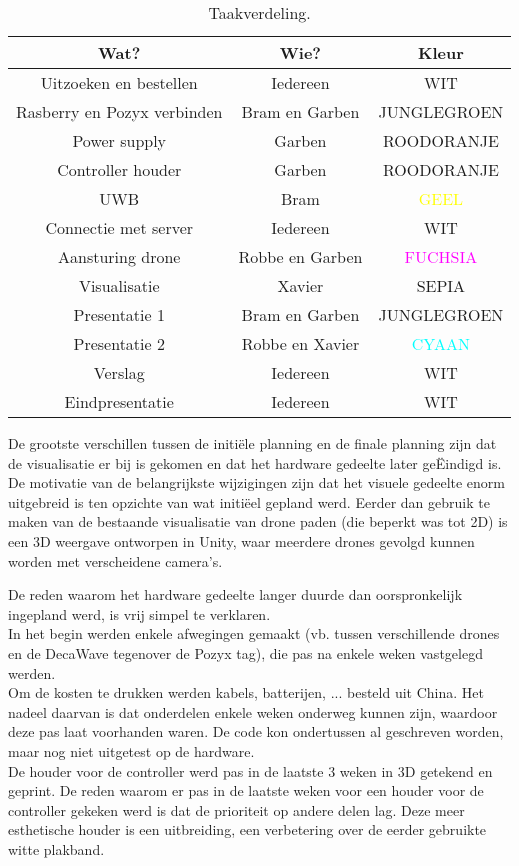\begin{table}[p]
	\centering
	\begin{tabular}{ |c|c|c| } \hline
		Wat? & Wie? & Kleur \\ [.5ex] \hline\hline
		Uitzoeken en bestellen & Iedereen & WIT \\ \hline
		Rasberry en Pozyx verbinden & Bram en Garben & \textcolor{JungleGreen}{JUNGLEGROEN} \\ \hline
		Power supply & Garben & \textcolor{RedOrange}{ROODORANJE} \\ \hline
		Controller houder & Garben & \textcolor{RedOrange}{ROODORANJE} \\ \hline
		UWB & Bram & \textcolor{Yellow}{GEEL} \\ \hline
		Connectie met server & Iedereen & WIT \\ \hline
		Aansturing drone & Robbe en Garben & \textcolor{Fuchsia}{FUCHSIA} \\ \hline
		Visualisatie & Xavier & \textcolor{Sepia}{SEPIA} \\ \hline
		Presentatie 1 & Bram en Garben & \textcolor{JungleGreen}{JUNGLEGROEN} \\ \hline
		Presentatie 2 & Robbe en Xavier & \textcolor{Cyan}{CYAAN} \\ \hline
		Verslag & Iedereen & WIT \\ \hline
		Eindpresentatie & Iedereen & WIT \\ \hline
	\end{tabular}
	\caption[Taakverdeling]{Taakverdeling.}
	\label{tab:taakverdeling}
\end{table}

De grootste verschillen tussen de initiële planning en de finale planning zijn dat de visualisatie er bij is gekomen en dat het hardware gedeelte later geËindigd is.\\

De motivatie van de belangrijkste wijzigingen zijn dat het visuele gedeelte enorm uitgebreid is ten opzichte van wat initiëel gepland werd.
Eerder dan gebruik te maken van de bestaande visualisatie van drone paden (die beperkt was tot 2D) is een 3D weergave ontworpen in Unity, waar meerdere drones gevolgd kunnen worden met verscheidene camera's.

De reden waarom het hardware gedeelte langer duurde dan oorspronkelijk ingepland werd, is vrij simpel te verklaren.\\
In het begin werden enkele afwegingen gemaakt (vb. tussen verschillende drones en de DecaWave tegenover de Pozyx tag), die pas na enkele weken vastgelegd werden.\\
Om de kosten te drukken werden kabels, batterijen, ... besteld uit China.
Het nadeel daarvan is dat onderdelen enkele weken onderweg kunnen zijn, waardoor deze pas laat voorhanden waren.
De code kon ondertussen al geschreven worden, maar nog niet uitgetest op de hardware.\\
De houder voor de controller werd pas in de laatste 3 weken in 3D getekend en geprint.
De reden waarom er pas in de laatste weken voor een houder voor de controller gekeken werd is dat de prioriteit op andere delen lag.
Deze meer esthetische houder is een uitbreiding, een verbetering over de eerder gebruikte witte plakband.